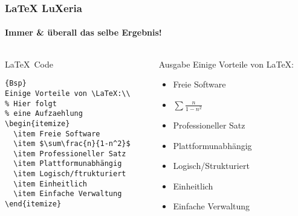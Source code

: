\begin{frame}[fragile]
	\frametitle{\LaTeX \hfill{} \footnotesize{LuXeria}}
	\framesubtitle{Immer \& überall das selbe Ergebnis!}
	\begin{columns}
		\begin{column}{5cm}
			\begin{block}{\LaTeX~Code}
				
\begin{lstlisting}{Bsp}
Einige Vorteile von \LaTeX:\\
% Hier folgt 
% eine Aufzaehlung
\begin{itemize}
  \item Freie Software
  \item $\sum\frac{n}{1-n^2}$
  \item Professioneller Satz
  \item Plattformunabhängig
  \item Logisch/ftrukturiert
  \item Einheitlich
  \item Einfache Verwaltung
\end{itemize}
\end{lstlisting}
				
			\end{block}
		\end{column}
		\begin{column}{5cm}
			\begin{block}{Ausgabe}
				Einige Vorteile von \LaTeX:\\
				\begin{itemize}
					\item Freie Software
					\item $\sum\frac{n}{1-n^2}$
					\item Professioneller Satz
					\item Plattformunabhängig
					\item Logisch/Strukturiert
					\item Einheitlich
					\item Einfache Verwaltung
				\end{itemize}
			\end{block}
		\end{column}
	\end{columns}
\end{frame}

